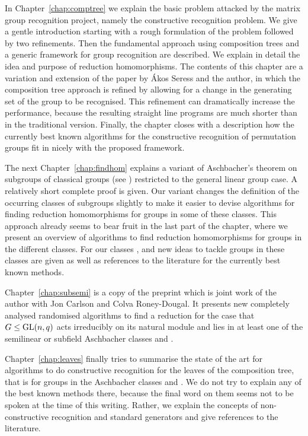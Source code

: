 In Chapter~\ref{chap:comptree} we explain the basic problem attacked
by the matrix group recognition project, namely the constructive
recognition problem. We give a gentle introduction starting with a
rough formulation of the problem followed by two refinements. Then the
fundamental approach using composition trees and a generic framework
for group recognition are described. We explain in detail the idea and
purpose of reduction homomorphisms. The
contents of this chapter are a variation and extension of the paper
\cite{AkosMaxISSAC} by \'Akos Seress and the author, in which the
composition tree approach is refined by allowing for a change in the generating
set of the group to be recognised. This refinement can dramatically
increase the performance, because the resulting straight line programs
are much shorter than in the traditional version. Finally, the chapter
closes with a description how the currently best known algorithms for
the constructive recognition of permutation groups fit in nicely with
the proposed framework.

The next Chapter~\ref{chap:findhom} explains a variant of Aschbacher's
theorem on subgroups of classical groups (see \cite{aschbacher})
restricted to the general linear
group case. A relatively short complete proof is given.
Our variant changes the definition of the occurring
classes of subgroups slightly to make it easier to devise algorithms
for finding reduction homomorphisms for groups in some of these classes.
This approach already seems to bear fruit in the last part of the
chapter, where we present an overview of algorithms to find reduction
homomorphisms for groups in the different classes. For our classes
,  and  new ideas to tackle groups in these classes are
given as well as references to the literature for the currently best
known methods.

Chapter~\ref{chap:subsemi} is a copy of the preprint \cite{subfieldpaper}
which is joint work of the author with Jon Carlson and Colva
Roney-Dougal. It presents new completely analysed randomised algorithms
to find a reduction for the case that $G \le \GL(n,q)$ acts irreducibly
on its natural module and lies in at least one of the semilinear or
subfield Aschbacher classes  and .

Chapter~\ref{chap:leaves} finally tries to summarise the state of the
art for algorithms to do constructive recognition for the leaves of
the composition tree, that is for groups in the Aschbacher classes
 and . We do not try to explain any of the best known
methods there, because the final word on them seems not to be spoken
at the time of this writing. Rather, we explain the concepts of non-constructive
recognition and standard generators and give references to the
literature.

